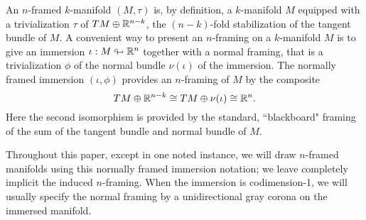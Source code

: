 \documentclass{amsart}
\begin{document}
An $n$-framed $k$-manifold $(M,\tau)$ is, by definition, a $k$-manifold $M$ equipped with a trivialization $\tau$ of $TM \oplus \mathbb R^{n-k}$, the $(n-k)$-fold stabilization of the tangent bundle of $M$.  A convenient way to present an $n$-framing on a $k$-manifold $M$ is to give an immersion $\iota: M \looparrowright \mathbb R^n$ together with a normal framing, that is a trivialization $\phi$ of the normal bundle $\nu(\iota)$ of the immersion.  The normally framed immersion $(\iota, \phi)$ provides an $n$-framing of $M$ by the composite
\[
TM \oplus \mathbb R^{n-k} \cong TM \oplus \nu(\iota) \cong \mathbb R^n.
\]
Here the second isomorphism is provided by the standard, ``blackboard" framing of the sum of the tangent bundle and normal bundle of $M$.

Throughout this paper, except in one noted instance, we will draw $n$-framed manifolds using this normally framed immersion notation; we leave completely implicit the induced $n$-framing.  When the immersion is codimension-1, we will usually specify the normal framing by a unidirectional gray corona on the immersed manifold.
\end{document}
